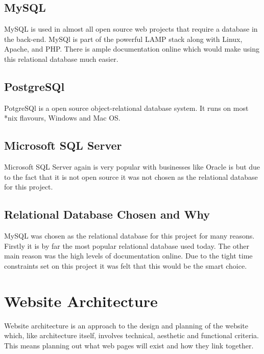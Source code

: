 \documentclass[a4paper, 12pt]{report}
\begin{document}
\subsection{MySQL}
MySQL is used in almost all open source web projects that require a database in the back-end. MySQl is part of the powerful LAMP stack along with Linux, Apache, and PHP. There is ample documentation online which would make using this relational database much easier\cite{MySQL}. 

\subsection{PostgreSQl} 
PotgreSQl is a open source object-relational database system. It runs on most *nix flavours, Windows and Mac OS\cite{PostgreSQL}. 

\subsection{Microsoft SQL Server}
Microsoft SQL Server again is very popular with businesses like Oracle is but due to the fact that it is not open source it was not chosen as the relational database for this project\cite{microsoftSQl}.

\subsection{Relational Database Chosen and Why}
MySQL was chosen as the relational database for this project for many reasons. Firstly it is by far the most popular relational database used today. The other main reason was the high levels of documentation online. Due to the tight time constraints set on this project it was felt that this would be the smart choice.

\section{Website Architecture}
Website architecture is an approach to the design and planning of the website which, like architecture itself, involves technical, aesthetic and functional criteria\cite{web_arch}. This means planning out what web pages will exist and how they link together. 
\end{document}
